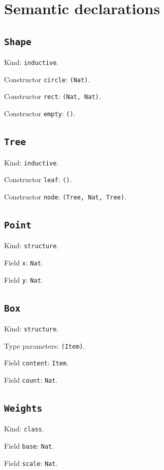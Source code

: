 \documentclass[11pt]{article}
\begin{document}
\section*{Semantic declarations}
\subsection*{\texttt{Shape}}
\noindent Kind: \texttt{inductive}.\par
\noindent Constructor \texttt{circle}: \texttt{(Nat)}.\par
\noindent Constructor \texttt{rect}: \texttt{(Nat, Nat)}.\par
\noindent Constructor \texttt{empty}: \texttt{()}.\par
\subsection*{\texttt{Tree}}
\noindent Kind: \texttt{inductive}.\par
\noindent Constructor \texttt{leaf}: \texttt{()}.\par
\noindent Constructor \texttt{node}: \texttt{(Tree, Nat, Tree)}.\par
\subsection*{\texttt{Point}}
\noindent Kind: \texttt{structure}.\par
\noindent Field \texttt{x}: \texttt{Nat}.\par
\noindent Field \texttt{y}: \texttt{Nat}.\par
\subsection*{\texttt{Box}}
\noindent Kind: \texttt{structure}.\par
\noindent Type parameters: \texttt{(Item)}.\par
\noindent Field \texttt{content}: \texttt{Item}.\par
\noindent Field \texttt{count}: \texttt{Nat}.\par
\subsection*{\texttt{Weights}}
\noindent Kind: \texttt{class}.\par
\noindent Field \texttt{base}: \texttt{Nat}.\par
\noindent Field \texttt{scale}: \texttt{Nat}.\par
\end{document}
